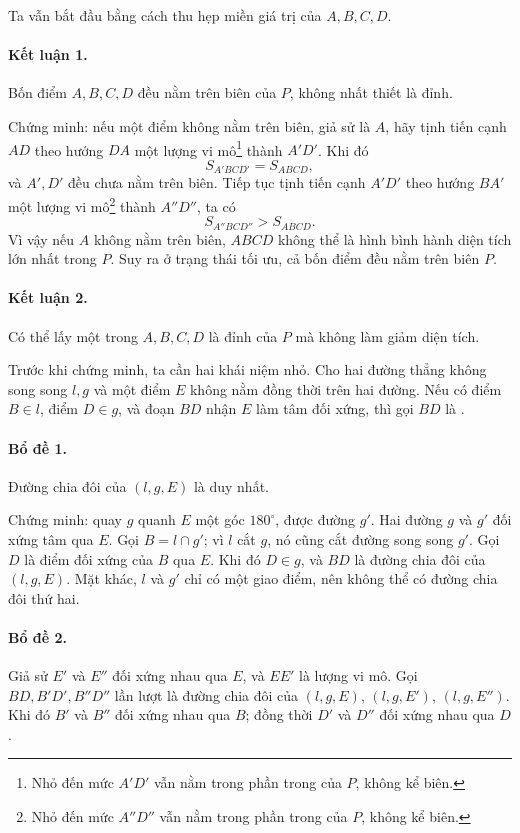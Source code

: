 \documentclass[11pt]{article}
\newcommand{\area}[1]{S_{#1}}
\begin{document}
Ta vẫn bắt đầu bằng cách thu hẹp miền giá trị của \(A,B,C,D\).

\paragraph{Kết luận 1.}
Bốn điểm \(A,B,C,D\) đều nằm trên biên của \(P\), không nhất thiết là đỉnh.

Chứng minh: nếu một điểm không nằm trên biên, giả sử là \(A\), hãy tịnh tiến
cạnh \(AD\) theo hướng \(DA\) một lượng vi mô\footnote{Nhỏ đến mức
\(A'D'\) vẫn nằm trong phần trong của \(P\), không kể biên.} thành \(A'D'\).
Khi đó
\[
  \area{A'BCD'}=\area{ABCD},
\]
và \(A',D'\) đều chưa nằm trên biên. Tiếp tục tịnh tiến cạnh \(A'D'\) theo
hướng \(BA'\) một lượng vi mô\footnote{Nhỏ đến mức \(A''D''\) vẫn nằm trong
phần trong của \(P\), không kể biên.} thành \(A''D''\), ta có
\[
  \area{A''BCD''}>\area{ABCD}.
\]
Vì vậy nếu \(A\) không nằm trên biên, \(ABCD\) không thể là hình bình hành diện
tích lớn nhất trong \(P\). Suy ra ở trạng thái tối ưu, cả bốn điểm đều nằm
trên biên \(P\).

\paragraph{Kết luận 2.}
Có thể lấy một trong \(A,B,C,D\) là đỉnh của \(P\) mà không làm giảm diện tích.

Trước khi chứng minh, ta cần hai khái niệm nhỏ. Cho hai đường thẳng không song
song \(l,g\) và một điểm \(E\) không nằm đồng thời trên hai đường. Nếu có điểm
\(B\in l\), điểm \(D\in g\), và đoạn \(BD\) nhận \(E\) làm tâm đối xứng, thì
gọi \(BD\) là .

\paragraph{Bổ đề 1.}
Đường chia đôi của \((l,g,E)\) là duy nhất.

Chứng minh: quay \(g\) quanh \(E\) một góc \(180^\circ\), được đường \(g'\).
Hai đường \(g\) và \(g'\) đối xứng tâm qua \(E\). Gọi \(B=l\cap g'\); vì
\(l\) cắt \(g\), nó cũng cắt đường song song \(g'\). Gọi \(D\) là điểm đối
xứng của \(B\) qua \(E\). Khi đó \(D\in g\), và \(BD\) là đường chia đôi của
\((l,g,E)\). Mặt khác, \(l\) và \(g'\) chỉ có một giao điểm, nên không thể có
đường chia đôi thứ hai.

\paragraph{Bổ đề 2.}
Giả sử \(E'\) và \(E''\) đối xứng nhau qua \(E\), và \(EE'\) là lượng vi mô.
Gọi \(BD,B'D',B''D''\) lần lượt là đường chia đôi của
\((l,g,E)\), \((l,g,E')\), \((l,g,E'')\). Khi đó \(B'\) và \(B''\) đối xứng
nhau qua \(B\); đồng thời \(D'\) và \(D''\) đối xứng nhau qua \(D\).
\end{document}
